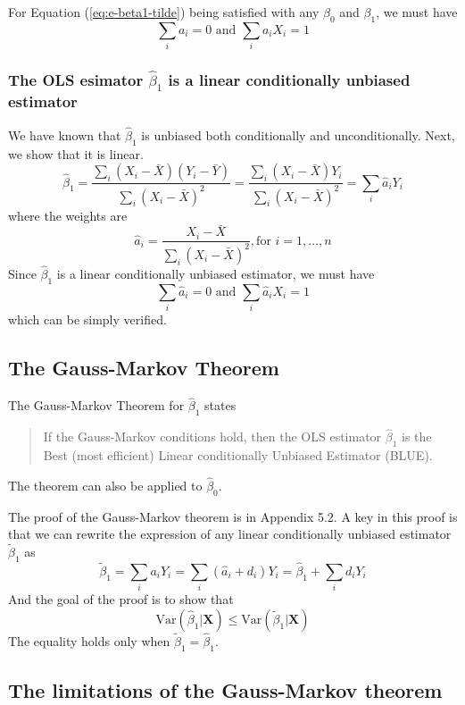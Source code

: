 \documentclass[a4paper,11pt]{article}
\newcommand{\var}{\mathrm{Var}}
\begin{document}
For Equation (\ref{eq:e-beta1-tilde}) being satisfied with any
\(\beta_0\) and \(\beta_1\), we must have
\[ \sum_i a_i = 0 \text{ and } \sum_i a_iX_i = 1 \]

\subsubsection*{The OLS esimator \(\hat{\beta}_1\) is a linear conditionally unbiased estimator}
\label{sec:orgc323ae7}

We have known that \(\hat{\beta}_1\) is unbiased both conditionally and
unconditionally. Next, we show that it is linear.
\[ \hat{\beta}_1 = \frac{\sum_i (X_i - \bar{X})(Y_i - \bar{Y})}{\sum_i
(X_i - \bar{X})^2} = \frac{\sum_i (X_i - \bar{X})Y_i}{\sum_i
(X_i - \bar{X})^2} = \sum_i \hat{a}_i Y_i \]
where the weights are
\[ \hat{a}_i = \frac{X_i - \bar{X}}{\sum_i (X_i - \bar{X})^2}, \text{
for } i = 1, \ldots, n \]
Since \(\hat{\beta}_1\) is a linear conditionally unbiased estimator, we
must have
\[ \sum_i \hat{a}_i = 0 \text{ and } \sum_i \hat{a}_i X_i = 1  \]
which can be simply verified.


\subsection{The Gauss-Markov Theorem}
\label{sec:org52554ae}

The Gauss-Markov Theorem for \(\hat{\beta}_1\) states
\label{org283879b}
\begin{quote}
If the Gauss-Markov conditions hold, then the OLS estimator
\(\hat{\beta}_1\) is the Best (most efficient) Linear conditionally
Unbiased Estimator (BLUE).
\end{quote}

The theorem can also be applied to \(\hat{\beta}_0\).

The proof of the Gauss-Markov theorem is in Appendix 5.2. A key in
this proof is that we can rewrite the expression of any linear
conditionally unbiased estimator \(\tilde{\beta}_1\) as
\[ \tilde{\beta}_1 = \sum_i a_i Y_i = \sum_i (\hat{a}_i + d_i)Y_i =
\hat{\beta}_1 + \sum_i d_i Y_i \]
And the goal of
the proof is to show that
\[ \var(\hat{\beta}_1 | \mathbf{X}) \leq \var(\tilde{\beta}_1 |
\mathbf{X}) \]
The equality holds only when \(\tilde{\beta}_1 = \hat{\beta}_1\).


\subsection{The limitations of the Gauss-Markov theorem}
\label{sec:orgf076f8d}
\end{document}
